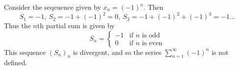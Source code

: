 \documentclass[../real_analysis.tex]{subfiles}
\begin{document}
            \begin{example}
                Consider the seqeuence given by $x_n=(-1)^n$. Then
                \begin{equation}
                    S_1=-1,\ S_2=-1+(-1)^2=0,\ S_3=-1+(-1)^2+(-1)^3=-1\dots
                \end{equation}
                Thus the $n$th partial sum is given by
                \begin{equation}
                    S_n=\begin{cases}
                        -1 & \text{if $n$ is odd}\\
                        0 & \text{if $n$ is even}
                    \end{cases}
                \end{equation}
                This sequence $(S_n)_n$ is divergent, and so the series $\sum_{n=1}^\infty(-1)^n$ is not defined.
            \end{example}
\end{document}
